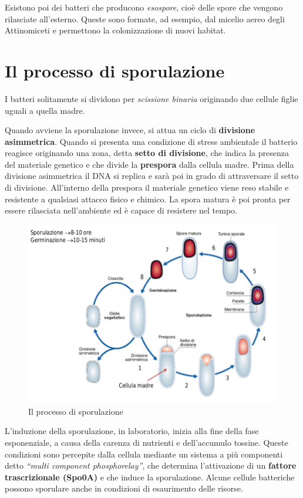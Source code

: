 \documentclass[11pt]{book}
\begin{document}
Esistono poi dei batteri che producono \emph{esospore}, cioè delle spore che vengono rilasciate all'esterno. Queste sono formate, ad esempio, dal micelio aereo degli Attinomiceti e permettono la colonizzazione di nuovi habitat.



\section{Il processo di sporulazione}
I batteri solitamente si dividono per \emph{scissione binaria} originando due cellule figlie uguali a quella madre.

Quando avviene la sporulazione invece, si attua un ciclo di \textbf{divisione asimmetrica}. Quando si presenta una condizione di stress ambientale il batterio reagisce originando una zona, detta \textbf{setto di divisione}, che indica la presenza del materiale genetico e che divide la \textbf{prespora} dalla cellula madre. Prima della divisione asimmetrica il DNA si replica e sarà poi in grado di attraversare il setto di divisione.
All'interno della prespora il materiale genetico viene reso stabile e resistente a qualsiasi attacco fisico e chimico. La spora matura è poi pronta per essere rilasciata nell'ambiente ed è capace di resistere nel tempo.

\clearpage

\begin{figure}[htp]
\centering
\includegraphics[scale=0.4]{img/Sporulazione.png}
\caption{Il processo di sporulazione}
\label{}
\end{figure}

L'induzione della sporulazione, in laboratorio, inizia alla fine della fase esponenziale, a causa della carenza di nutrienti e dell'accumulo tossine.
Queste condizioni sono percepite dalla cellula mediante un sistema a più componenti detto \emph{``multi component phosphorelay''}, che determina l’attivazione di un \textbf{fattore trascrizionale (Spo0A)} e che induce la sporulazione.
Alcune cellule batteriche possono sporulare anche in condizioni di esaurimento delle risorse.
\end{document}
